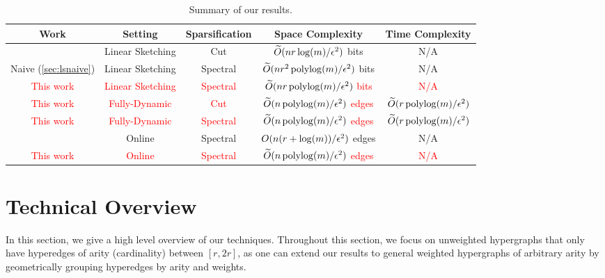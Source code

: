 \documentclass{article}
\begin{document}
\renewcommand{\arraystretch}{1.5}
\begin{center}
\begin{table}
\begin{tabular}{||c c c c c||}
 \hline
 Work & Setting & Sparsification & Space Complexity & Time Complexity \\ [0.5ex] 
 \hline\hline
 \cite{KPS24c} & Linear Sketching & Cut & $\widetilde{O}(nr\log(m)/\epsilon^2)$ bits & N/A \\
 \hline
  Naive ({\hypersetup{linkcolor=black}\cref{sec:lsnaive}}) & Linear Sketching & Spectral & $\widetilde{O}(n r^2 \operatorname{polylog}(m)/\epsilon^2)$ bits & N/A \\
 \hline
 \textcolor{red}{This work} & \textcolor{red}{Linear Sketching} & \textcolor{red}{Spectral} & \textcolor{red}{$\widetilde{O}(nr\operatorname{polylog}(m) / \epsilon^2)$ bits} & \textcolor{red}{N/A} \\
 \hline
 \textcolor{red}{This work} & \textcolor{red}{Fully-Dynamic} & \textcolor{red}{Cut} &
 \textcolor{red}{$\widetilde{O}(n\operatorname{polylog}(m) / \epsilon^2)$ edges} &
 \textcolor{red}{$\widetilde{O}({r \operatorname{polylog}(m)/\epsilon^{2}}{})$} \\ 
 \hline
 \textcolor{red}{This work} & \textcolor{red}{Fully-Dynamic} &
 \textcolor{red}{Spectral} & \textcolor{red}{$\widetilde{O}(n\operatorname{polylog}(m) / \epsilon^2)$ edges} & \textcolor{red}{$\widetilde{O}({r\operatorname{polylog}(m)/\epsilon^{2}}{})$} \\
 \hline
 
 \cite{STY24} & Online & Spectral & $O(n (r + \log(m)) / \epsilon^2)$ edges & N/A \\ 
 \hline
 \textcolor{red}{This work} & \textcolor{red}{Online} & \textcolor{red}{Spectral} &
 \textcolor{red}{$\widetilde{O}(n\operatorname{polylog}(m) / \epsilon^2)$ edges} & \textcolor{red}{N/A} \\[1ex] 
 \hline
\end{tabular}
\caption{Summary of our results.}
\end{table}
\end{center}



\section{Technical Overview}

In this section, we give a high level overview of our techniques.
Throughout this section,
we focus on
unweighted
hypergraphs that only have hyperedges of arity (cardinality) between $[r,2r]$,
as one can extend our results to general weighted hypergraphs of arbitrary arity by geometrically grouping hyperedges by arity and weights.
\end{document}
